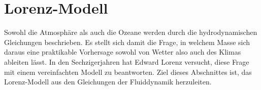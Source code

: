 %
%
%
%
\section{Lorenz-Modell\label{section:lorenz-modell}}
Sowohl die Atmosphäre als auch die Ozeane werden durch die hydrodynamischen
Gleichungen beschrieben.
Es stellt sich damit die Frage, in welchem Masse sich daraus eine praktikable
Vorhersage sowohl von Wetter also auch des Klimas ableiten lässt.
In den Sechzigerjahren hat Edward Lorenz versucht, diese Frage mit einem
vereinfachten Modell zu beantworten.
Ziel dieses Abschnittes ist, das Lorenz-Modell aus den Gleichungen der
Fluiddynamik herzuleiten.

